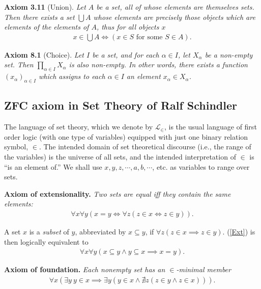 \documentclass{book}
\newcommand{\titl}[1]{\noindent\textbf{#1}}
\begin{document}
\begin{framed}
\titl{Axiom 3.11} (Union). \emph{Let $A$ be a set, all of whose elements are themselves sets. Then there exists a set $\bigcup A$ whose elements are precisely those objects which are elements of the elements of $A$, thus for all objects $x$}
\begin{align*}
   x\in\bigcup A\iff(x\in S\text{ for some }S\in A).
\end{align*}
\end{framed}

\begin{framed}
\titl{Axiom 8.1} (Choice). \emph{Let $I$ be a set, and for each $\alpha\in I$, let $X_\alpha$ be a non-empty set. Then $\prod_{\alpha\in I}X_\alpha$ is also non-empty. In other words, there exists a function $(x_{\alpha})_{\alpha\in I}$ which assigns to each $\alpha\in I$ an element $x_\alpha\in X_\alpha$.}
\end{framed}
\vspace{2em}
\subsection{ZFC axiom in Set Theory of Ralf Schindler}

The language of set theory, which we denote by $\mathscr{L}_{\in}$, is the usual language of first order logic (with one type of variables) equipped with just one binary relation symbol, $\in$. The intended domain of set theoretical discourse (i.e., the range of the variables) is the universe of all sets, and the intended interpretation of $\in$ is “is an element of.” We shall use $x,y,z,\cdots,a,b,\cdots$, etc. as variables to range over sets.

\begin{framed}
\titl{Axiom of extensionality.} \emph{Two sets are equal iff they contain the same elements:}
    \begin{align*}
        \forall x\forall y(x=y\iff\forall z(z\in x\iff z\in y)).\tag{Ext}\label{Ext}
    \end{align*}
\end{framed}

A set $x$ is a \emph{subset} of $y$, abbreviated by $x\subseteq y$, if $\forall z(z\in x\implies z\in y)$. (\ref{Ext}) is then logically equivalent to
    \begin{align*}
        \forall x\forall y(x\subseteq y\land y\subseteq x\implies x=y).
    \end{align*}

\begin{framed}
\titl{Axiom of foundation.} \emph{Each nonempty set has an $\in$-minimal member}
    \begin{align*}
        \forall x(\exists y\ y\in x\implies\exists y(y\in x\land\nexists z(z\in y\land z\in x))).\tag{Fund}\label{Fund}
    \end{align*}
\end{framed}
\end{document}
